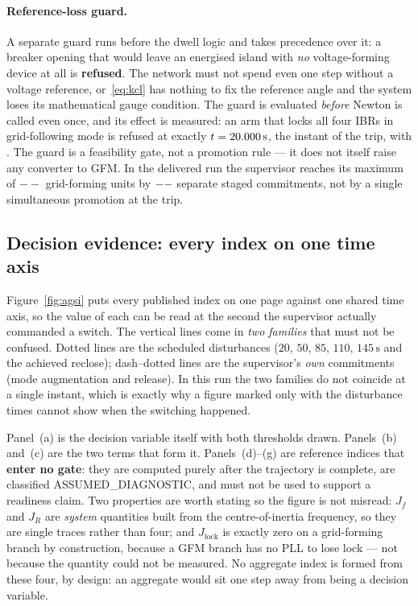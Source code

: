 \documentclass[12pt,a4paper]{article}
\theoremstyle{remark}
\newcommand{\second}{\,\mathrm{s}}
\newcommand{\NewRunGfmMax}{--}\newcommand{\NewRunSamples}{--}%
\begin{document}
\paragraph{Reference-loss guard.}
A separate guard runs before the dwell logic and takes precedence over it: a
breaker opening that would leave an energised island with \emph{no}
voltage-forming device at all is \textbf{refused}. The network must not spend even
one step without a voltage reference, or~\eqref{eq:kcl} has nothing to fix the
reference angle and the system loses its mathematical gauge condition. The guard
is evaluated \emph{before} Newton is called even once, and its effect is measured:
an arm that locks all four IBRs in grid-following mode is refused at exactly
$t=\ArmLockedgflHorizon\second$, the instant of the trip, with
\ArmLockedgflFailure. The guard is a
feasibility gate, not a promotion rule --- it does not itself raise any converter
to GFM. In the delivered run the supervisor reaches its maximum of
$\NewRunGfmMax$ grid-forming units by $--$ separate staged
commitments, not by a single simultaneous promotion at the trip.

\subsection{Decision evidence: every index on one time axis}\label{sec:agsi-fig}
Figure~\ref{fig:agsi} puts every published index on one page against one shared
time axis, so the value of each can be read at the second the supervisor actually
commanded a switch. The vertical lines come in \emph{two families} that must not
be confused. Dotted lines are the scheduled disturbances ($20$, $50$, $85$, $110$,
$145\second$ and the achieved reclose); dash--dotted lines are the supervisor's
\emph{own} commitments (mode augmentation and release). In this run the two
families do not coincide at a single instant, which is exactly why a figure marked
only with the disturbance times cannot show when the switching happened.

Panel~(a) is the decision variable itself with both thresholds drawn. Panels~(b)
and~(c) are the two terms that form it. Panels~(d)--(g) are reference indices that
\textbf{enter no gate}: they are computed purely after the trajectory is complete,
are classified \textsf{ASSUMED\_DIAGNOSTIC}, and must not be used to support a
readiness claim. Two properties are worth stating so the figure is not
misread: $J_f$ and $J_R$ are \emph{system} quantities built from the
centre-of-inertia frequency, so they are single traces rather than four; and
$J_{\mathrm{lock}}$ is exactly zero on a grid-forming branch by construction,
because a GFM branch has no PLL to lose lock --- not because the quantity could
not be measured. No aggregate index is formed from these four, by design: an
aggregate would sit one step away from being a decision variable.
\end{document}
